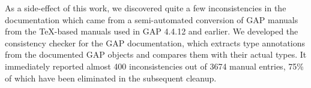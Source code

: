 As a side-effect of this work, we discovered quite a few inconsistencies in the \GAP
documentation which came from a semi-automated conversion of GAP manuals from the
\TeX-based manuals used in GAP 4.4.12 and earlier.  We developed the consistency checker
for the GAP documentation, which extracts type annotations from the documented GAP objects
and compares them with their actual types. It immediately reported almost 400
inconsistencies out of 3674 manual entries, 75\% of which have been
eliminated in the subsequent cleanup.


